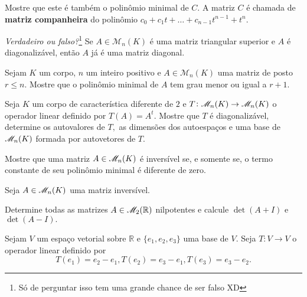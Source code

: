 \documentclass[11pt,a4paper]{article}
\begin{document}
    Mostre que este é também o polinômio minimal de $C.$ A matriz $C$ é chamada de \textbf{matriz companheira} do polinômio $c_0 + c_1t + \ldots + c_{n−1}t^{n−1} + t^n.$
       \solucao{}
   
     \textit{Verdadeiro ou falso?}\footnote{Só de perguntar isso tem uma grande chance de ser falso XD} Se $A \in \mathcal{M}_n(K)$ é uma matriz triangular superior e $A$ é diagonalizável, então $A$ já é uma matriz diagonal.
   \solucao{}
   
     Sejam $K$ um corpo, $n$ um inteiro positivo e $A \in \mathcal{M}_n(K)$ uma matriz de posto $r \le n.$ Mostre que o polinômio minimal de $A$ tem grau menor ou igual a $r + 1.$ 
    
   \solucao{}
   
     Seja $K$ um corpo de característica diferente de $2$ e $T \colon \mathcal{M}_{n}(K) \to  \mathcal{M}_{n}(K)$ o operador linear
definido por $T(A) = A^t$. Mostre que $T$ é diagonalizável, determine os autovalores de $T,$ as dimensões dos autoespaços e uma base de $\mathcal{M}_{n}(K)$ formada por autovetores de $T.$
   \solucao{}
   
     Mostre que uma matriz $A \in \mathcal{M}_{n}(K)$ é inversível se, e somente se, o termo constante de seu polinômio minimal é diferente de zero.
    
   \solucao{}
   
      Seja $A \in \mathcal{M}_{n}(K)$ uma matriz inversível. 

  \solucao{}
   
      Determine todas as matrizes $A \in \mathcal{M}_{2}(\mathbb{R})$ nilpotentes e calcule  $\det(A + I)$ e $\det(A − I).$
    
  \solucao{}
   
     Sejam $V$ um espaço vetorial sobre $\mathbb{R}$ e $\{e_1,e_2,e_3\}$ uma base de $V.$ Seja $T \colon V \to V$ o operador linear definido por
\[T(e_1) = e_2 − e_1, T(e_2) = e_3 − e_1, T(e_3) = e_3 − e_2.\]
        
\end{document}

